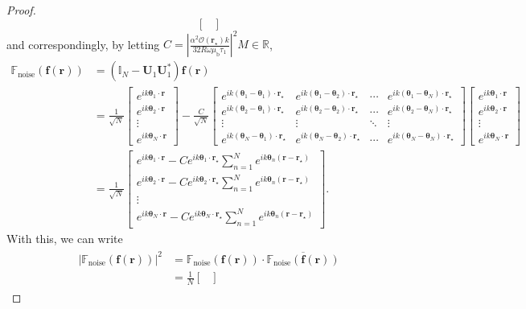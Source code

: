 \documentclass[3p,10pt]{elsarticle}
\newcommand{\mub}{\mu_\mathrm{b}}
\newcommand{\mf}{\mathbf{f}}
\newcommand{\mr}{\mathbf{r}}
\newcommand{\mU}{\mathbf{U}}
\newcommand{\vt}{\boldsymbol{\theta}}
\DeclareMathOperator*{\noise}{noise}
\theoremstyle{plain}
\theoremstyle{remark}
\begin{document}
\begin{proof}
\[\begin{bmatrix}
\end{bmatrix}\]
and correspondingly, by letting $C=\left|\frac{\alpha^2\mathcal{O}(\mr_\star)k}{32R\omega\mub\tau_1}\right|^2M\in\mathbb{R}$,
\begin{align*}
\mathbb{F}_{\noise}(\mf(\mr))&=(\mathbb{I}_N-\mU_1\mU_1^*)\mf(\mr)\\
&=\frac{1}{\sqrt{N}}
\begin{bmatrix}
e^{ik\vt_1\cdot\mr}\\
e^{ik\vt_2\cdot\mr}\\
\vdots\\
e^{ik\vt_N\cdot\mr}
\end{bmatrix}-\frac{C}{\sqrt{N}}\begin{bmatrix}
e^{ik(\vt_1-\vt_1)\cdot\mr_\star} & e^{ik(\vt_1-\vt_2)\cdot\mr_\star} & \cdots & e^{ik(\vt_1-\vt_N)\cdot\mr_\star} \\
e^{ik(\vt_2-\vt_1)\cdot\mr_\star} & e^{ik(\vt_2-\vt_2)\cdot\mr_\star} & \cdots & e^{ik(\vt_2-\vt_N)\cdot\mr_\star} \\
\vdots & \vdots & \ddots & \vdots \\
e^{ik(\vt_N-\vt_1)\cdot\mr_\star} & e^{ik(\vt_N-\vt_2)\cdot\mr_\star} & \cdots & e^{ik(\vt_N-\vt_N)\cdot\mr_\star}
\end{bmatrix}
\begin{bmatrix}
e^{ik\vt_1\cdot\mr}\\
e^{ik\vt_2\cdot\mr}\\
\vdots\\
e^{ik\vt_N\cdot\mr}
\end{bmatrix}\\
&=\frac{1}{\sqrt{N}}
\begin{bmatrix}
\displaystyle e^{ik\vt_1\cdot\mr}-Ce^{ik\vt_1\cdot\mr_\star}\sum_{n=1}^{N}e^{ik\vt_n(\mr-\mr_\star)}\\
\displaystyle e^{ik\vt_2\cdot\mr}-Ce^{ik\vt_2\cdot\mr_\star}\sum_{n=1}^{N}e^{ik\vt_n(\mr-\mr_\star)}\\
\vdots\\
\displaystyle e^{ik\vt_N\cdot\mr}-Ce^{ik\vt_N\cdot\mr_\star}\sum_{n=1}^{N}e^{ik\vt_n(\mr-\mr_\star)}
\end{bmatrix}.
\end{align*}
With this, we can write
\begin{align}
\begin{aligned}\label{FactorF}
|\mathbb{F}_{\noise}(\mf(\mr))|^2&=\mathbb{F}_{\noise}(\mf(\mr))\cdot\overline{\mathbb{F}_{\noise}(\mf(\mr))}\\
&=\frac{1}{N}
\begin{bmatrix}

\end{bmatrix}
\end{aligned}
\end{align}
\end{proof}
\end{document}
